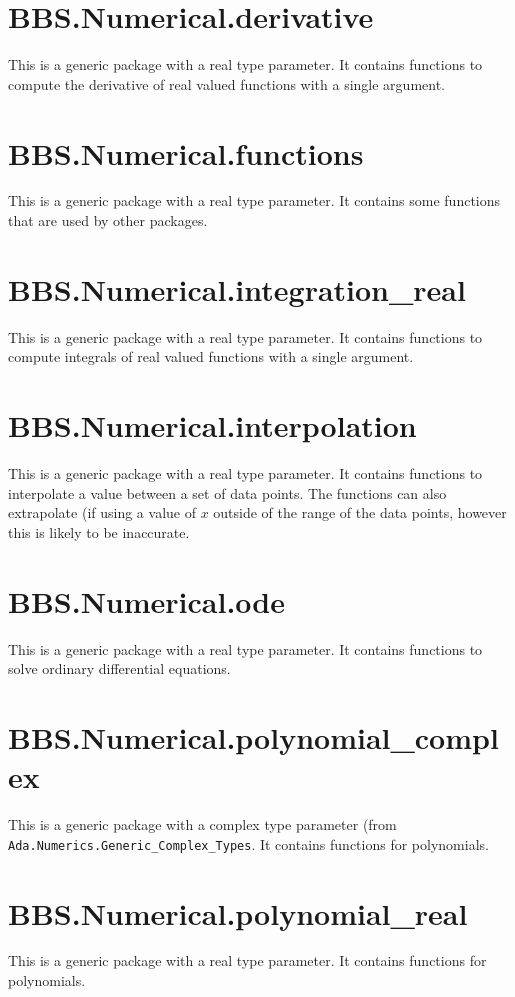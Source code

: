 \documentclass[10pt, openany]{book}
\newcommand{\package}[1]{\texttt{#1}}
\begin{document}
\section{BBS.Numerical.derivative}
This is a generic package with a real type parameter.  It contains functions to compute the derivative of real valued functions with a single argument.

\section{BBS.Numerical.functions}
This is a generic package with a real type parameter.  It contains some functions that are used by other packages.

\section{BBS.Numerical.integration\_real}
This is a generic package with a real type parameter.  It contains functions to compute integrals of real valued functions with a single argument.

\section{BBS.Numerical.interpolation}
This is a generic package with a real type parameter.  It contains functions to interpolate a value between a set of data points.  The functions can also extrapolate (if using a value of $x$ outside of the range of the data points, however this is likely to be inaccurate.

\section{BBS.Numerical.ode}
This is a generic package with a real type parameter.  It contains functions to solve ordinary differential equations.

\section{BBS.Numerical.polynomial\_complex}
This is a generic package with a complex type parameter (from \package{Ada.Numerics.Generic\_Complex\_Types}.  It contains functions for polynomials.

\section{BBS.Numerical.polynomial\_real}
This is a generic package with a real type parameter.  It contains functions for polynomials.
\end{document}
